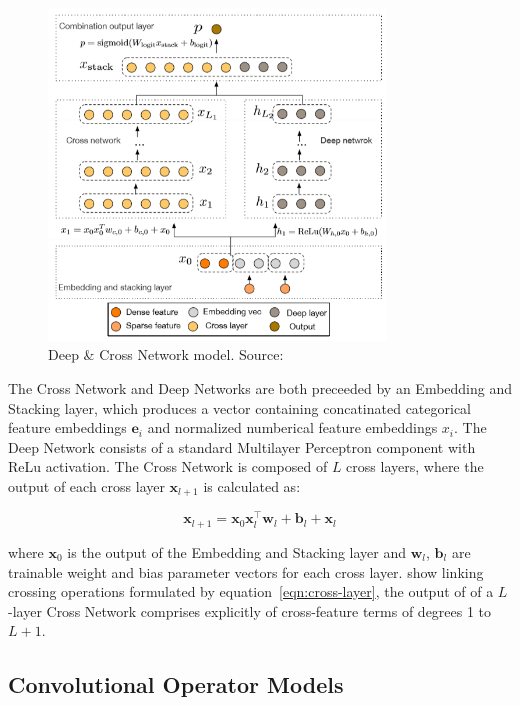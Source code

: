 \documentclass{mldsmsc}
\begin{document}
\begin{figure}[h]
    \centering
    \includegraphics[width=0.8\textwidth]{../figures/dcn.png}
    \caption{Deep \& Cross Network model. Source: \citep{RefWorks:wang2017deep}}
    \label{fig:dcn}
\end{figure}

The Cross Network and Deep Networks are both preceeded by an Embedding and Stacking layer, which produces
a vector containing concatinated categorical feature embeddings $\mathbf{e}_i$ and normalized numberical
feature embeddings $x_i$. The Deep Network consists of a standard Multilayer Perceptron component with
ReLu activation. The Cross Network is composed of $L$ cross layers, where the output of each
cross layer $\mathbf{x}_{l+1}$ is calculated as:

\begin{equation}\label{eqn:cross-layer}
    \mathbf{x}_{l+1} = \mathbf{x}_0 \mathbf{x}_l^{\intercal} \mathbf{w}_l + \mathbf{b}_l + \mathbf{x}_l
\end{equation}

where $\mathbf{x}_0$ is the output of the Embedding and Stacking layer and $\mathbf{w}_l$, $\mathbf{b}_l$
are trainable weight and bias parameter vectors for each cross layer. \cite{RefWorks:wang2017deep}
show linking crossing operations formulated by equation~\ref{eqn:cross-layer}, the output of of a
$L$-layer Cross Network comprises explicitly of cross-feature terms of degrees 1 to $L+1$.

\subsection{Convolutional Operator Models}
\end{document}
